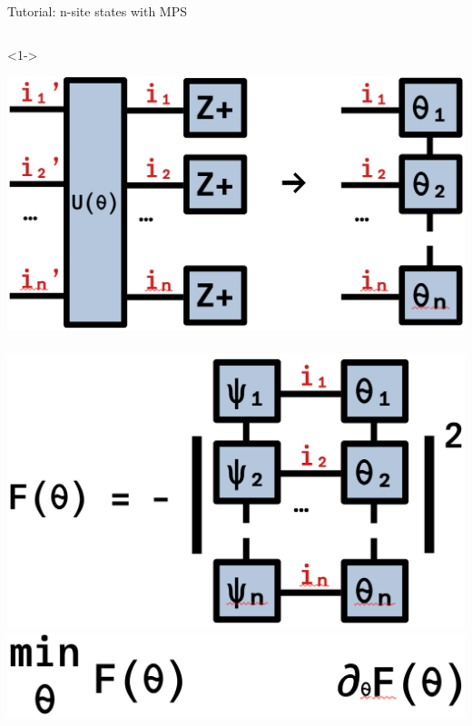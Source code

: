 \begin{frame}[fragile]{Tutorial: n-site states with MPS}
\begin{columns}
\begin{column}{4.5cm}
\begin{onlyenv}<1->
\vspace*{0.0cm}
\begin{center}
\includegraphics[width=\textwidth]{
  slides/assets/U_Zpn.png
} \\
~\\
\includegraphics[width=\textwidth]{
  slides/assets/psin_thetan.png
} \\
\includegraphics[width=\textwidth]{
  slides/assets/min_grad_F_theta.png
}
\end{center}
\vspace*{0.0cm}
\end{onlyenv}


\end{column}

\end{columns}

\end{frame}
